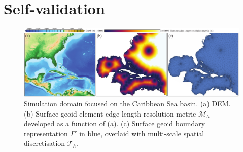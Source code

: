 \documentclass[a4paper, 10pt]{book}
\providecommand{\brep}{boundary representation\xspace}
\begin{document}
\section{Self-validation}
\label{sec:self-validation}
%
\begin{figure}[!h]
\begin{center}
\includegraphics[width=\textwidth]{fig/caribbean.pdf}
\end{center}
\caption{
Simulation domain focused on the Caribbean Sea basin.
(a) \cite{gebco} DEM.
(b) Surface geoid element edge-length resolution metric
$\mathcal{M}_h$ developed as a function of (a).
(c) Surface geoid \brep
$\Gamma'$
in blue,
overlaid with multi-scale spatial discretisation
$\mathcal{T}_h$.
}
\label{fig:caribbean}
\end{figure}
%
%
\end{document}
